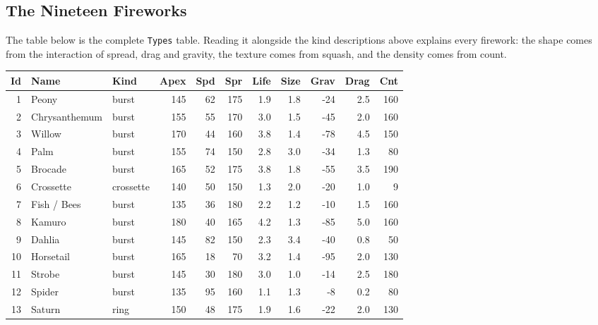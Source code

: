 \documentclass[12pt,letterpaper]{article}
\begin{document}
\subsection{The Nineteen Fireworks}

The table below is the complete \texttt{Types} table. Reading it alongside the kind descriptions above explains every firework: the shape comes from the interaction of spread, drag and gravity, the texture comes from squash, and the density comes from count.

\begin{table}[H]
\centering
\scriptsize
\begin{tabular}{|r|p{2.5cm}|p{1.6cm}|r|r|r|r|r|r|r|r|}
\hline
\textbf{Id} & \textbf{Name} & \textbf{Kind} & \textbf{Apex} & \textbf{Spd} & \textbf{Spr} & \textbf{Life} & \textbf{Size} & \textbf{Grav} & \textbf{Drag} & \textbf{Cnt} \\
\hline
1  & Peony             & burst     & 145 & 62 & 175 & 1.9 & 1.8 & -24 & 2.5 & 160 \\
\hline
2  & Chrysanthemum     & burst     & 155 & 55 & 170 & 3.0 & 1.5 & -45 & 2.0 & 160 \\
\hline
3  & Willow            & burst     & 170 & 44 & 160 & 3.8 & 1.4 & -78 & 4.5 & 150 \\
\hline
4  & Palm              & burst     & 155 & 74 & 150 & 2.8 & 3.0 & -34 & 1.3 & 80  \\
\hline
5  & Brocade           & burst     & 165 & 52 & 175 & 3.8 & 1.8 & -55 & 3.5 & 190 \\
\hline
6  & Crossette         & crossette & 140 & 50 & 150 & 1.3 & 2.0 & -20 & 1.0 & 9   \\
\hline
7  & Fish / Bees       & burst     & 135 & 36 & 180 & 2.2 & 1.2 & -10 & 1.5 & 160 \\
\hline
8  & Kamuro            & burst     & 180 & 40 & 165 & 4.2 & 1.3 & -85 & 5.0 & 160 \\
\hline
9  & Dahlia            & burst     & 145 & 82 & 150 & 2.3 & 3.4 & -40 & 0.8 & 50  \\
\hline
10 & Horsetail         & burst     & 165 & 18 & 70  & 3.2 & 1.4 & -95 & 2.0 & 130 \\
\hline
11 & Strobe            & burst     & 145 & 30 & 180 & 3.0 & 1.0 & -14 & 2.5 & 180 \\
\hline
12 & Spider            & burst     & 135 & 95 & 160 & 1.1 & 1.3 & -8  & 0.2 & 80  \\
\hline
13 & Saturn            & ring      & 150 & 48 & 175 & 1.9 & 1.6 & -22 & 2.0 & 130 \\

\end{tabular}
\end{table}
\end{document}
